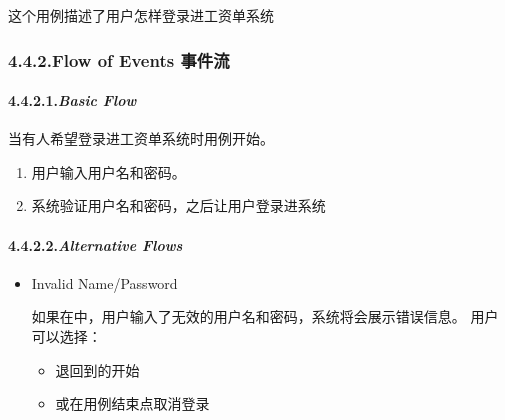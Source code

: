 \documentclass{article}
\begin{document}
\noindent{}这个用例描述了用户怎样登录进工资单系统%

\subsubsection{4.4.2.\hspace*{0.5em}Flow of Events 事件流}\label{sec-flow-of-events-}%

\paragraph{4.4.2.1.\hspace*{0.5em}\emph{Basic Flow}}\label{sec-_basic-flow_}%

\noindent{}\mdbr
{}当有人希望登录进工资单系统时用例开始。%

\begin{enumerate}[noitemsep,topsep=\mdcompacttopsep]%

\item{}用户输入用户名和密码。%

\item{}系统验证用户名和密码，之后让用户登录进系统%
\end{enumerate}%

\paragraph{4.4.2.2.\hspace*{0.5em}\emph{Alternative Flows}}\label{sec-_alternative-flows_}%

\begin{itemize}%

\item{}
Invalid Name/Password%

如果在中，用户输入了无效的用户名和密码，系统将会展示错误信息。
用户可以选择：%

\begin{itemize}[noitemsep,topsep=\mdcompacttopsep]%

\item{}退回到的开始%

\item{}或在用例结束点取消登录%
\end{itemize}%
\end{itemize}%
\end{document}
